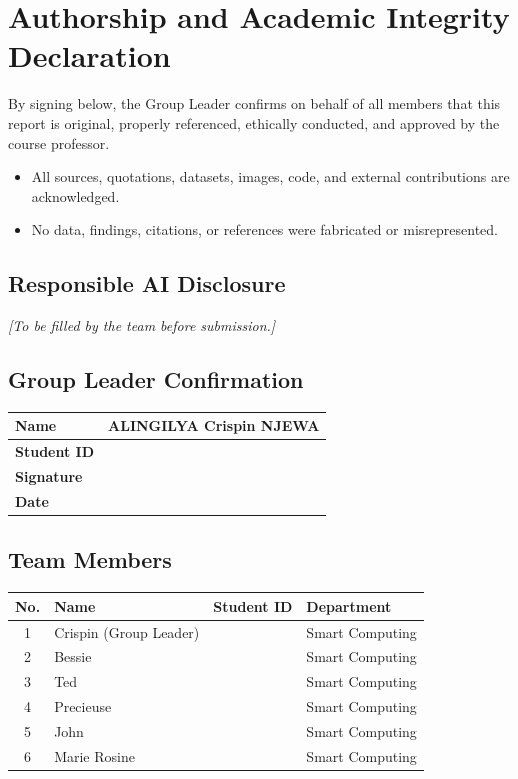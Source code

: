 \documentclass[a4paper, 11pt]{article}
\begin{document}
\newpage

\section*{Authorship and Academic Integrity Declaration}

By signing below, the Group Leader confirms on behalf of all members that this report is original, properly referenced, ethically conducted, and approved by the course professor.

\begin{itemize}[nosep]
    \item All sources, quotations, datasets, images, code, and external contributions are acknowledged.
    \item No data, findings, citations, or references were fabricated or misrepresented.
\end{itemize}

\subsection*{Responsible AI Disclosure}
\textit{[To be filled by the team before submission.]}

\subsection*{Group Leader Confirmation}
\begin{tabular}{|l|p{8cm}|}
\hline
\textbf{Name} & ALINGILYA Crispin NJEWA \\
\hline
\textbf{Student ID} & \\
\hline
\textbf{Signature} & \\
\hline
\textbf{Date} & \\
\hline
\end{tabular}

\subsection*{Team Members}
\begin{tabular}{|c|l|l|l|}
\hline
\textbf{No.} & \textbf{Name} & \textbf{Student ID} & \textbf{Department} \\
\hline
1 & Crispin (Group Leader) & & Smart Computing \\
\hline
2 & Bessie & & Smart Computing \\
\hline
3 & Ted & & Smart Computing \\
\hline
4 & Precieuse & & Smart Computing \\
\hline
5 & John & & Smart Computing \\
\hline
6 & Marie Rosine & & Smart Computing \\
\hline
\end{tabular}
\end{document}
